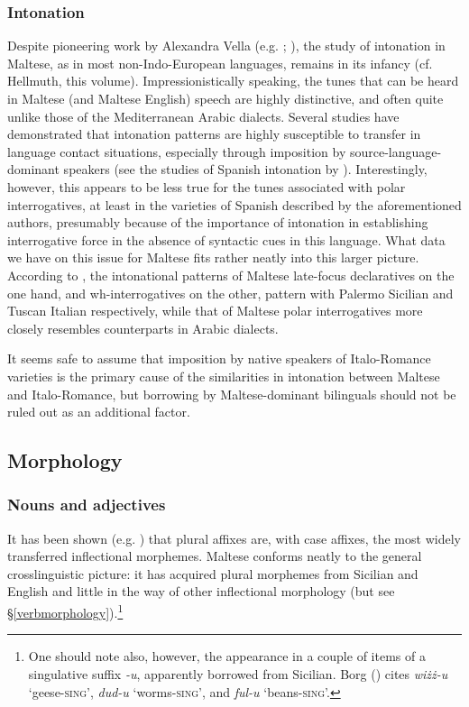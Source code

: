 \documentclass[output=paper]{langsci/langscibook}
\begin{document}
\subsubsection{Intonation}
Despite pioneering work by Alexandra Vella (e.g. \citealt{Vella1994,vella2003,Vella2009}; \citealt{GriceVellaBruggeman2019}), the study of intonation in Maltese, as in most non-Indo-European languages, remains in its infancy (cf. Hellmuth, this volume). Impressionistically speaking, the tunes that can be heard in Maltese (and Maltese English) speech are highly distinctive, and often quite unlike those of the Mediterranean Arabic dialects. Several studies have demonstrated that intonation patterns are highly susceptible to transfer in language contact situations, especially through imposition by source-language-dominant speakers (see the studies of Spanish intonation by \citealt{orourke2005,gabrielkireva2014}). Interestingly, however, this appears to be less true for the tunes associated with polar interrogatives, at least in the varieties of Spanish described by the aforementioned authors, presumably because of the importance of intonation in establishing interrogative force in the absence of syntactic cues in this language. What data we have on this issue for Maltese fits rather neatly into this larger picture. According to \cite{vella2003}, the intonational patterns of Maltese late-focus declaratives on the one hand, and wh-interrogatives on the other, pattern with Palermo Sicilian and Tuscan Italian respectively, while that of Maltese polar interrogatives more closely resembles counterparts in Arabic dialects.

It seems safe to assume that imposition by native speakers of Italo-Romance varieties is the primary cause of the similarities in intonation between Maltese and Italo-Romance, but borrowing by Maltese-dominant bilinguals should not be ruled out as an additional factor.

\subsection{Morphology}
\subsubsection{Nouns and adjectives}
 \label{inflection}
It has been shown (e.g. \citealt{Gardani2012,Seifart2017}) that plural affixes are, with case affixes, the most widely transferred inflectional morphemes. Maltese conforms neatly to the general crosslinguistic picture: it has acquired plural morphemes from Sicilian and English and little in the way of other inflectional morphology (but see §\ref{verbmorphology}).\footnote{One should note also, however, the appearance in a couple of items of a singulative suffix \textit{-u}, apparently borrowed from Sicilian. Borg (\citeyear[57]{Borg1994}) cites \textit{wiżż-u} `geese-\textsc{sing}', \textit{dud-u} `worms-\textsc{sing}', and \textit{ful-u} `beans-\textsc{sing}'.}
\end{document}
